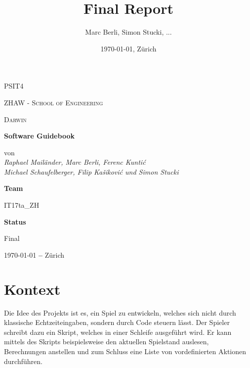 \documentclass[11pt,a4paper,german]{scrartcl}
\title{Final Report}
\author{Marc Berli, Simon Stucki, ...}
\date{\today{}, Zürich}
\let\oldsection\section
\renewcommand\section{\clearpage\oldsection}
\begin{document}
\begin{titlepage}
  \centering
  {\scshape\LARGE PSIT4 \par}
  \vspace{1cm}
  {\scshape ZHAW - School of Engineering\par}
  \vspace{1cm}
  {\scshape\Large Darwin\par}
  \vspace{1.5cm}
  {\huge\bfseries Software Guidebook\par}
  \vspace{2cm}
  von
  \vspace{1em}
  \Large\itshape \\ Raphael Mailänder, Marc Berli, Ferenc Kuntić \\ Michael Schaufelberger, Filip Kašiković und Simon Stucki\par
  \vfill
  \textbf{Team}\par
  IT17ta\_ZH\par
  \vspace{2em}
  \textbf{Status}\par
  Final

  \vfill

  {\large \today \textbf{ --} Zürich\par}
\end{titlepage}

\tableofcontents

\newpage

\section{Kontext}

Die Idee des Projekts ist es, ein Spiel zu entwickeln, welches sich nicht durch klassische Echtzeiteingaben,
sondern durch Code steuern lässt.
Der Spieler schreibt dazu ein Skript, welches in einer Schleife ausgeführt wird.
Er kann mittels des Skripts beispielsweise den aktuellen Spielstand auslesen, Berechnungen anstellen und zum Schluss eine Liste von vordefinierten Aktionen durchführen.
\end{document}
